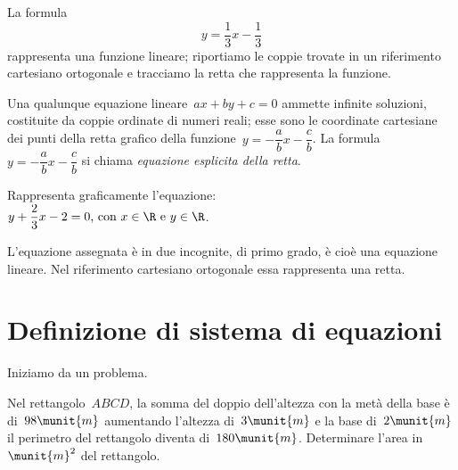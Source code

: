 \begin{esempio}{}{}
La formula \[y=\frac{1}{3}x-\frac{1}{3}\] rappresenta una funzione
lineare; riportiamo le coppie trovate in un riferimento cartesiano
ortogonale e tracciamo la retta che rappresenta la funzione.

Una qualunque equazione lineare~\(ax+by+c=0\) ammette infinite
soluzioni, costituite da coppie ordinate di numeri reali; esse sono le
coordinate cartesiane dei punti della retta grafico della 
funzione~\(y=-{\dfrac{a}{b}}x-\dfrac{c}{b}\).
La formula~\(y=-{\dfrac{a}{b}}x-\dfrac{c}{b}\) si chiama \emph{equazione 
esplicita della retta}.
\end{esempio}

\begin{esempio}{}{}
Rappresenta graficamente l'equazione: \\
\(y+\dfrac{2}{3}x-2=0\text{, con } x\in\R\text{ e }y\in\R\).

\medskip
L'equazione assegnata è in due incognite, di primo
grado, è cioè una equazione lineare. Nel riferimento cartesiano
ortogonale essa rappresenta una retta.


\end{esempio}

\section{Definizione di sistema di equazioni}
\label{sec:sist_definizione}

Iniziamo da un problema.

\begin{problema}{}{}
\label{pr:22.1}
Nel rettangolo~\(ABCD\), la somma del doppio dell'altezza con la metà 
della base è di~\(98\munit{m}\) aumentando l'altezza di~\(3\munit{m}\) e 
la base di~\(2\munit{m}\) il perimetro del rettangolo diventa 
di~\(180\munit{m}\). 
Determinare l'area in~\(\munit{m}^{2}\) del rettangolo.
\end{problema}

